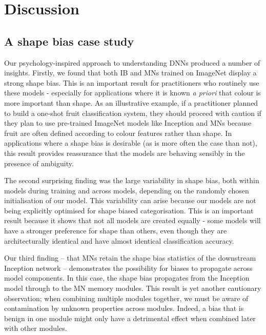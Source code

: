 \documentclass{article}
\begin{document}
\section{Discussion}\subsection{A shape bias case study}

Our psychology-inspired approach to understanding DNNs produced a number of insights. Firstly, we found that both IB and MNs trained on ImageNet display a strong shape bias. This is an important result for practitioners who routinely use these models - especially for applications where it is known \emph{a priori} that colour is more important than shape. As an illustrative example, if a practitioner planned to build a one-shot fruit classification system, they should proceed with caution if they plan to use pre-trained ImageNet models like Inception and MNs because fruit are often defined according to colour features rather than shape. In applications where a shape bias is desirable (as is more often the case than not), this result provides reassurance that the models are behaving sensibly in the presence of ambiguity. 

The second surprising finding was the large variability in shape bias, both within models during training and across models, depending on the randomly chosen initialisation of our model. This variability can arise because our models are not being explicitly optimised for shape biased categorisation. This is an important result because it shows that not all models are created equally - some models will have a stronger preference for shape than others, even though they are architecturally identical and have almost identical classification accuracy. 

Our third finding -- that MNs retain the shape bias statistics of the downstream Inception network -- demonstrates the possibility for biases to propagate across model components. In this case, the shape bias propagates from the Inception model through to the MN memory modules. This result is yet another cautionary observation; when combining multiple modules together, we must be aware of contamination by unknown properties across modules. Indeed, a bias that is benign in one module might only have a detrimental effect when combined later with other modules.
\end{document}

